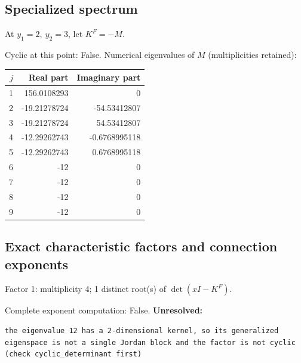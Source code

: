 \documentclass[10pt,a4paper]{article}
\newcommand{\fitmath}[1]{\sbox{\mathbox}{$\displaystyle #1$}\ifdim\wd\mathbox>\linewidth\resizebox{\linewidth}{!}{\usebox{\mathbox}}\else\usebox{\mathbox}\fi}
\begin{document}
\subsection*{Specialized spectrum}
At $y_1=2,\ y_2=3$, let $K^F=-M$.
\begin{center}\fitmath{\Delta=0}\end{center}
Cyclic at this point: False.
Numerical eigenvalues of $M$ (multiplicities retained):
\begin{center}\small\begin{tabular}{rrr}\toprule $j$ & Real part & Imaginary part\\\midrule
1 & 156.0108293 & 0\\
2 & -19.21278724 & -54.53412807\\
3 & -19.21278724 & 54.53412807\\
4 & -12.29262743 & -0.6768995118\\
5 & -12.29262743 & 0.6768995118\\
6 & -12 & 0\\
7 & -12 & 0\\
8 & -12 & 0\\
9 & -12 & 0\\
\bottomrule\end{tabular}\end{center}
\subsection*{Exact characteristic factors and connection exponents}
Factor 1: multiplicity 4; 1 distinct root(s) of $\det(xI-K^F)$.
\begin{center}\fitmath{\begin{aligned}p_{1}(x)&=x - 12\end{aligned}}\end{center}
Complete exponent computation: False.
\textbf{Unresolved:}

\begin{lstlisting}
the eigenvalue 12 has a 2-dimensional kernel, so its generalized eigenspace is not a single Jordan block and the factor is not cyclic (check cyclic_determinant first)
\end{lstlisting}
\end{document}

